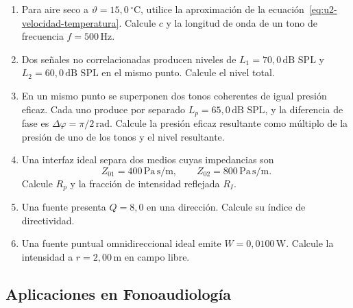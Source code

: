 \begin{enumerate}[label=\textbf{N\arabic*.},leftmargin=*]
    \item Para aire seco a
    \(\vartheta=15{,}0\,^{\circ}\text{C}\), utilice la aproximación de la
    ecuación~\eqref{eq:u2-velocidad-temperatura}. Calcule \(c\) y la longitud
    de onda de un tono de frecuencia \(f=500\,\text{Hz}\).

    \item Dos señales no correlacionadas producen niveles de
    \(L_1=70{,}0\,\text{dB SPL}\) y
    \(L_2=60{,}0\,\text{dB SPL}\) en el mismo punto. Calcule el nivel total.

    \item En un mismo punto se superponen dos tonos coherentes de igual presión
    eficaz. Cada uno produce por separado
    \(L_p=65{,}0\,\text{dB SPL}\), y la diferencia de fase es
    \(\Delta\varphi=\pi/2\,\text{rad}\). Calcule la presión eficaz resultante
    como múltiplo de la presión de uno de los tonos y el nivel resultante.

    \item Una interfaz ideal separa dos medios cuyas impedancias son
    \[
        Z_{01}=400\,\text{Pa}\,\text{s}/\text{m},
        \qquad
        Z_{02}=800\,\text{Pa}\,\text{s}/\text{m}.
    \]
    Calcule \(R_p\) y la fracción de intensidad reflejada \(R_I\).

    \item Una fuente presenta \(Q=8{,}0\) en una dirección. Calcule su índice
    de directividad.

    \item Una fuente puntual omnidireccional ideal emite
    \(W=0{,}0100\,\text{W}\). Calcule la intensidad a
    \(r=2{,}00\,\text{m}\) en campo libre.
\end{enumerate}

\subsection*{Aplicaciones en Fonoaudiología}

